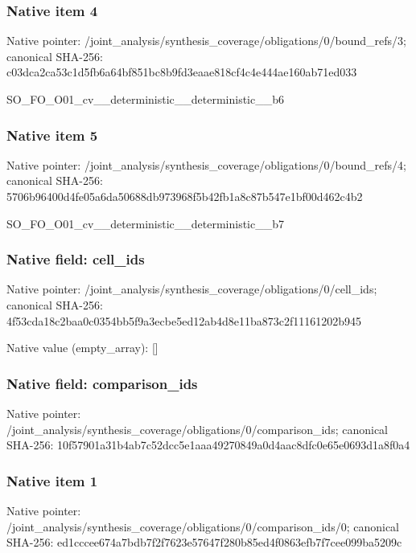 \documentclass[10pt,a4paper]{article}
\begin{document}
\subsubsection{Native item 4}
Native pointer: /joint\_\allowbreak{}analysis/synthesis\_\allowbreak{}coverage/obligations/0/bound\_\allowbreak{}refs/3; canonical SHA-256: c03dca2ca53c1d5fb6a64bf851bc8b9fd3eaae818cf4c4e444ae160ab71ed033

\begingroup\raggedright\sloppy SO\_\allowbreak{}FO\_\allowbreak{}O01\_\allowbreak{}cv\_\allowbreak{}\_\allowbreak{}deterministic\_\allowbreak{}\_\allowbreak{}deterministic\_\allowbreak{}\_\allowbreak{}b6\par\endgroup

\subsubsection{Native item 5}
Native pointer: /joint\_\allowbreak{}analysis/synthesis\_\allowbreak{}coverage/obligations/0/bound\_\allowbreak{}refs/4; canonical SHA-256: 5706b96400d4fe05a6da50688db973968f5b42fb1a8c87b547e1bf00d462c4b2

\begingroup\raggedright\sloppy SO\_\allowbreak{}FO\_\allowbreak{}O01\_\allowbreak{}cv\_\allowbreak{}\_\allowbreak{}deterministic\_\allowbreak{}\_\allowbreak{}deterministic\_\allowbreak{}\_\allowbreak{}b7\par\endgroup

\subsubsection{Native field: cell\_\allowbreak{}ids}
Native pointer: /joint\_\allowbreak{}analysis/synthesis\_\allowbreak{}coverage/obligations/0/cell\_\allowbreak{}ids; canonical SHA-256: 4f53cda18c2baa0c0354bb5f9a3ecbe5ed12ab4d8e11ba873c2f11161202b945

Native value (empty\_\allowbreak{}array): []

\subsubsection{Native field: comparison\_\allowbreak{}ids}
Native pointer: /joint\_\allowbreak{}analysis/synthesis\_\allowbreak{}coverage/obligations/0/comparison\_\allowbreak{}ids; canonical SHA-256: 10f57901a31b4ab7c52dcc5e1aaa49270849a0d4aac8dfc0e65e0693d1a8f0a4

\subsubsection{Native item 1}
Native pointer: /joint\_\allowbreak{}analysis/synthesis\_\allowbreak{}coverage/obligations/0/comparison\_\allowbreak{}ids/0; canonical SHA-256: ed1cccee674a7bdb7f2f7623e57647f280b85ed4f0863efb7f7cee099ba5209c
\end{document}
